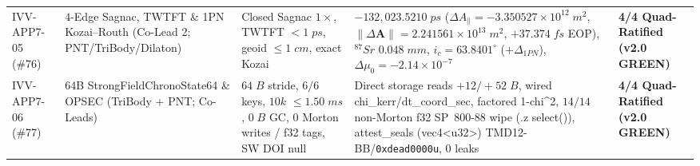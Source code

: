 \documentclass[11pt,a4paper,reqno]{article}
\def\texttt#1{#1}%
\def\mathrm#1{#1}%
\theoremstyle{plain}
\theoremstyle{definition}
\theoremstyle{remark}
\numberwithin{equation}{section}
\numberwithin{table}{section}
\begin{document}
\begin{table}[H]
\begin{tabularx}{\textwidth}{@{} C{2.00cm} P{3.00cm} P{3.10cm} Y C{2.50cm} @{}}
\texttt{IVV-APP7-05} (\#76) & $4$-Edge Sagnac, TWTFT \& 1PN Kozai--Routh (Co-Lead 2; PNT/\allowbreak TriBody/\allowbreak Dilaton) & Closed Sagnac $1\times$, TWTFT $<1\;\mathrm{ps}$, geoid $\le 1\;\mathrm{cm}$, exact Kozai & $-132{,}023.5210\;\mathrm{ps}$ ($\Delta A_\parallel = -3.350527\times 10^{12}\;\mathrm{m}^2$, $\|\Delta\mathbf{A}\|=2.241561\times 10^{13}\;\mathrm{m}^2$, $+37.374\;\mathrm{fs}$ EOP), $^{87}\mathrm{Sr}$ $0.048\;\mathrm{mm}$, $i_c=63.8401^\circ$ ($+\Delta_{1\mathrm{PN}}$), $\Delta\mu_0=-2.14\times 10^{-7}$ & \textbf{4/4 Quad-Ratified (v2.0 GREEN)} \\
\texttt{IVV-APP7-06} (\#77) & 64B \texttt{StrongField\allowbreak ChronoState64} \& OPSEC (TriBody + PNT; Co-Leads) & $64\;\mathrm{B}$ stride, $6/6$ keys, $10\mathrm{k}$ $\le 1.50\;\mathrm{ms}$, $0\;\mathrm{B}$ GC, $0$ Morton writes / \texttt{f32} tags, SW DOI \texttt{null} & Direct storage reads $+12/+52\;\mathrm{B}$, wired \texttt{chi\_kerr}/\texttt{dt\_coord\_sec}, factored \texttt{1-chi\^{}2}, $14/14$ non-Morton \texttt{f32} SP~800-88 wipe (\texttt{.z} \texttt{select()}), \texttt{attest\_seals} (\texttt{vec4<u32>}) \texttt{TMD12-BB}/\nolinkurl{0xdead0000u}, $0$ leaks & \textbf{4/4 Quad-Ratified (v2.0 GREEN)} \\
\bottomrule
\end{tabularx}
\end{table}
\end{document}

